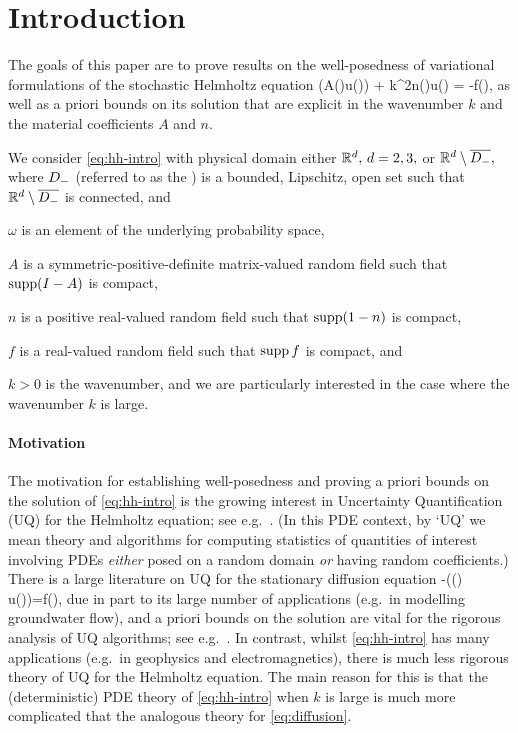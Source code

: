 \section{Introduction}\label{sec:intro}
The goals of this paper are to prove results on the well-posedness of variational formulations of the stochastic Helmholtz equation
\beq\label{eq:hh-intro}
\grad\cdot\mleft(A(\omega)\grad u(\omega)\mright) + k^2n(\omega)u(\omega) = -f(\omega),
\eeq
as well as a priori bounds on its solution that are explicit in the wavenumber $k$ and the material coefficients $A$ and $n.$


We consider \eqref{eq:hh-intro} with physical domain either $\mathbb R^{d}, \, d=2,3,$ or $\mathbb R^d\setminus\overline{D_{-}},$ where $D_{-}$ (referred to as the ) is a bounded, Lipschitz, open set such that $\mathbb R^{d}\setminus\overline{D_{-}}$ is connected, and

\bit
\item $\omega$ is an element of the underlying probability space,
\item $A$ is a symmetric-positive-definite matrix-valued random field such that $\operatorname{supp}(I-A)$ is compact,
\item $n$ is a positive real-valued random field such that $\operatorname{supp}(1-n)$ is compact,
\item $f$ is a real-valued random field such that $\operatorname{supp} f$ is compact, and
  \item $k>0$ is the wavenumber,
  \eit
and we are particularly interested in the case where the wavenumber $k$ is large.

\paragraph{Motivation} The motivation for establishing well-posedness and proving a priori bounds on the solution of \eqref{eq:hh-intro} is the growing interest in Uncertainty Quantification (UQ) for the Helmholtz equation; see e.g.~\cite{XiSh:07,TsXiYi:11,BuGh:14,GaHa:15,FeLiLo:15,FeLiNi:18,LiWaZh:18,HiScScSc:15,BaCaHaZh:18}. (In this PDE context, by `UQ' we mean theory and algorithms for computing statistics of quantities of interest involving PDEs \emph{either} posed on a random domain \emph{or} having random coefficients.) There is a large literature on UQ for the stationary diffusion equation
\beq\label{eq:diffusion}
-\grad\cdot (\kappa(\omega) \grad u(\omega))=f(\omega),
\eeq
due in part to its large number of applications (e.g.~in modelling groundwater flow), and a priori bounds on the solution are vital for the rigorous analysis of UQ algorithms; see e.g.~\cite{BaTeZo:04,BaNoTe:07,Gi:10,MuSt:11,ChScTe:13}. In contrast, whilst \eqref{eq:hh-intro} has many applications (e.g.~in geophysics and electromagnetics), there is much less rigorous theory of UQ for the Helmholtz equation. The main reason for this is that the (deterministic) PDE theory of \eqref{eq:hh-intro} when $k$ is large is much more complicated that the analogous theory for \eqref{eq:diffusion}.
 
